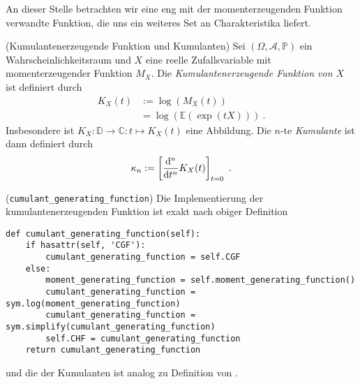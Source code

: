 An dieser Stelle betrachten wir eine eng mit der momenterzeugenden Funktion verwandte Funktion, die uns ein weiteres Set an Charakteristika liefert.

\begin{Definition}{(Kumulantenerzeugende Funktion und Kumulanten)}
Sei $(\Omega, \mathscr{A}, \mathbb{P})$ ein Wahrscheinlichkeitsraum und $X$ eine reelle Zufallsvariable mit momenterzeugender Funktion $M_X$. Die \textit{Kumulantenerzeugende Funktion von $X$}  ist definiert durch
\begin{align*}
K_X(t) &:= \log\left( M_X(t) \right)\\
&= \log\left( \mathbb{E}\left( \exp(t X) \right) \right)~.
\end{align*}
Insbesondere ist $K_X: \mathbb{D} \rightarrow \mathbb{C}: t \mapsto K_X(t)$ eine Abbildung. Die $n$-te \textit{Kumulante}  ist dann definiert durch
\[\kappa_n := \left[ \frac{\mathop{}\!\mathrm{d}^n}{\mathop{}\!\mathrm{d} t^n} K_X(t) \right]_{t = 0}~.\]
\end{Definition}

\begin{Code}{(\lstinline|cumulant_generating_function|)}
Die Implementierung der kumulantenerzeugenden Funktion ist exakt nach obiger Definition
\begin{lstlisting}
def cumulant_generating_function(self):
    if hasattr(self, 'CGF'):
        cumulant_generating_function = self.CGF
    else:
        moment_generating_function = self.moment_generating_function()
        cumulant_generating_function = sym.log(moment_generating_function)
        cumulant_generating_function = sym.simplify(cumulant_generating_function)
        self.CHF = cumulant_generating_function
    return cumulant_generating_function
\end{lstlisting}
und die der Kumulanten ist analog zu Definition von \hyperlink{Code:n_Moment_Generating}{}.
\end{Code}

\vspace*{-\medskipamount}

